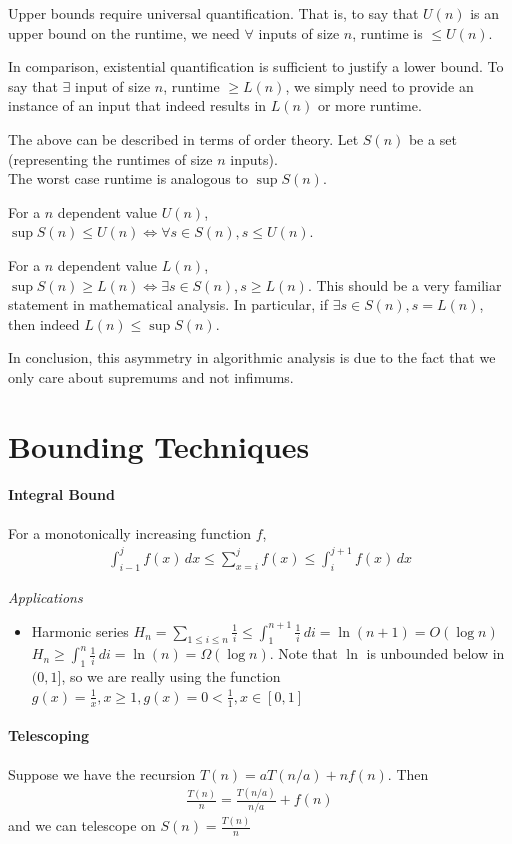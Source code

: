 \documentclass{article}
\begin{document}
Upper bounds require universal quantification. That is, to say that $U(n)$ is an upper bound on the runtime, we need $\forall$ inputs of size $n$, runtime is $\leq U(n)$.

In comparison, existential quantification is sufficient to justify a lower bound. To say that $\exists$ input of size $n$, runtime $\geq L(n)$, we simply need to provide an instance of an input that indeed results in $L(n)$ or more runtime.

The above can be described in terms of order theory. Let $S(n)$ be a set (representing the runtimes of size $n$ inputs).\\
The worst case runtime is analogous to $\sup S(n)$.

For a $n$ dependent value $U(n)$, $\sup S(n)\leq U(n) \iff \forall s\in S(n), s\leq U(n)$.

For a $n$ dependent value $L(n)$, $\sup S(n)\geq L(n) \iff \exists s\in S(n), s\geq L(n)$. This should be a very familiar statement in mathematical analysis. In particular, if $\exists s\in S(n), s=L(n)$, then indeed $L(n)\leq \sup S(n)$.

In conclusion, this asymmetry in algorithmic analysis is due to the fact that we only care about supremums and not infimums.

\section{Bounding Techniques}
\paragraph{Integral Bound}
For a monotonically increasing function $f$,
\begin{align*}
	\int_{i-1}^j f(x)\,dx \leq \sum_{x=i}^jf(x)\leq \int_i^{j+1}f(x)\,dx
\end{align*}

\textit{Applications}
\begin{itemize}
	\item Harmonic series $H_n=\sum_{1\leq i\leq n}\frac{1}{i}\leq \int_1^{n+1}\frac{1}{i}\,di=\ln(n+1)=O(\log n)$\\
	$H_n\geq \int_1^{n}\frac{1}{i}\,di=\ln(n)=\Omega(\log n)$. Note that $\ln$ is unbounded below in $(0,1]$, so we are really using the function $g(x) = \frac{1}{x}, x\geq 1, g(x) = 0 < \frac{1}{1}, x \in [0,1]$
\end{itemize}

\paragraph{Telescoping}\mbox{}
Suppose we have the recursion $T(n) = aT(n/a) + nf(n)$. Then 
\begin{align*}
	\frac{T(n)}{n}=\frac{T(n/a)}{n/a}+f(n)
\end{align*}
and we can telescope on $S(n)=\frac{T(n)}{n}$
\end{document}
